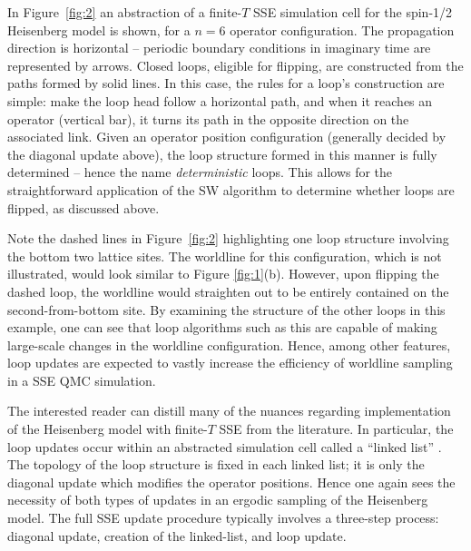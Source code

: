 \documentclass[vecphys]{svmult}
\begin{document}
In Figure~\ref{fig:2} an abstraction of a finite-$T$ SSE simulation cell for the spin-1/2 Heisenberg model is shown, for a $n=6$ operator configuration.  The propagation direction is horizontal -- periodic boundary conditions in imaginary time are represented by arrows.  Closed loops, eligible for flipping, are constructed from the  paths formed by solid lines.  In this case, the rules for a loop's construction are simple: make the loop head follow a horizontal path, and when it reaches an operator (vertical bar), it turns its path in the opposite direction on the associated link.  Given an operator position configuration (generally decided by the diagonal update above), the loop structure formed in this manner is fully determined -- hence the name {\it deterministic} loops.  
This allows for the straightforward application of the SW algorithm to determine whether loops are flipped, as discussed above.

Note the dashed lines in Figure~\ref{fig:2} highlighting one loop structure involving the bottom two lattice sites.  The worldline for this configuration, which is not illustrated, would look similar to Figure \ref{fig:1}(b).  However, upon flipping the dashed loop, the worldline would straighten out to be entirely contained on the second-from-bottom site.  By examining the structure of the other loops in this example, one can see that loop algorithms such as this are capable of making large-scale changes in the worldline configuration.  Hence, among other features, loop updates are expected to vastly increase the efficiency of worldline sampling in a SSE QMC simulation.

The interested reader can distill many of the nuances regarding implementation of the Heisenberg model with finite-$T$ SSE from the literature.    In particular, the loop updates occur within an abstracted simulation cell called a ``linked list'' \cite{Melko:Syljuasen02}.  The topology of the loop structure is fixed in each linked list; it is only the diagonal update which modifies the operator positions.  Hence one again sees the necessity of both types of updates in an ergodic sampling of the Heisenberg model.  The full SSE update procedure typically involves a three-step process: diagonal update, creation of the linked-list, and loop update.  
\end{document}

